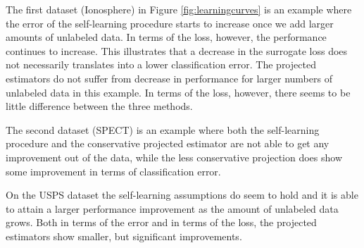 \documentclass{article}
\begin{document}

The first dataset (Ionosphere) in Figure \ref{fig:learningcurves} is an example where the error of the self-learning procedure starts to increase once we add larger amounts of unlabeled data. In terms of the loss, however, the performance continues to increase. This illustrates that a decrease in the surrogate loss does not necessarily translates into a lower classification error. The projected estimators do not suffer from decrease in performance for larger numbers of unlabeled data in this example. In terms of the loss, however, there seems to be little difference between the three methods.

The second dataset (SPECT) is an example where both the self-learning procedure and the conservative projected estimator are not able to get any improvement out of the data, while the less conservative projection does show some improvement in terms of classification error.

On the USPS dataset the self-learning assumptions do seem to hold and it is able to attain a larger performance improvement as the amount of unlabeled data grows. Both in terms of the error and in terms of the loss, the projected estimators show smaller, but significant improvements.

\end{document}
